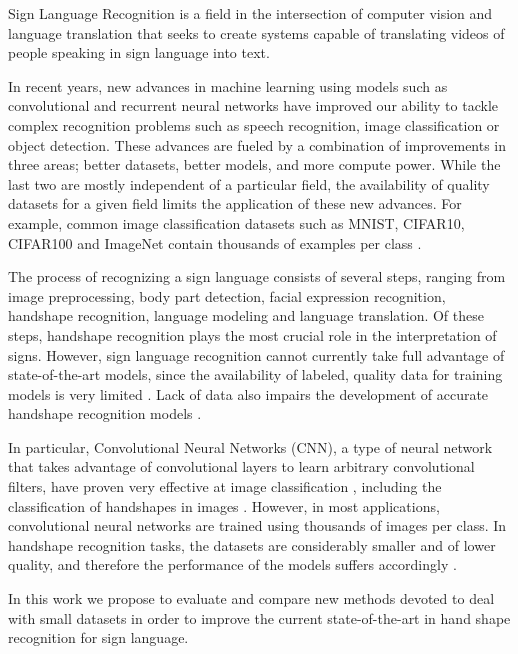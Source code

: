 Sign Language Recognition is a field in the intersection of computer vision and language translation that seeks to create systems capable of translating videos of people speaking in sign language into text.

In recent years, new advances in machine learning using models such as convolutional and recurrent neural networks have improved our ability to tackle complex recognition problems such as speech recognition,  image classification  or object detection\cite{Goodfellow2016DL}. These advances are fueled by a combination   of improvements in three areas; better datasets, better models, and more compute power. While the last two are mostly independent of a particular field, the availability of quality datasets for a given field limits the application of these new advances.  For example, common image classification datasets such as MNIST, CIFAR10, CIFAR100 and ImageNet contain  thousands of examples per class \cite{cubuk2019autoaugment}.

The process of recognizing a sign language consists of several steps, ranging from image preprocessing, body part detection, facial expression recognition, handshape recognition,  language modeling and language translation. Of these steps, handshape recognition plays the most crucial role in the interpretation of signs\cite{koller16,ronchetti2016sign}. However, sign language recognition cannot currently take full advantage  of state-of-the-art models, since  the availability of labeled, quality data for training models is very limited \cite{koller16}. Lack of data also impairs the development of accurate handshape recognition models \cite{koller16}. 

In particular, Convolutional Neural Networks (CNN), a type of neural network that takes advantage  of convolutional layers to learn arbitrary convolutional filters, have proven very effective at image classification \cite{Goodfellow2016DL}, including the classification of handshapes in images \cite{quiroga2017study}.  However, in most  applications, convolutional neural networks are trained using  thousands of images per class.  In handshape recognition tasks, the datasets are considerably smaller and of lower quality, and therefore the performance of the models suffers accordingly \cite{koller16,tang2015real,quiroga2017study}. 

In this work we propose to evaluate and compare new methods devoted to deal with small datasets in order to improve the current state-of-the-art in hand shape recognition for sign language.

